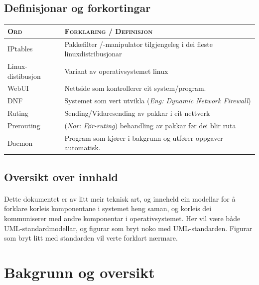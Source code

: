 \documentclass[nynorsk,12pt,a4paper]{article}
\begin{document}
\subsection{Definisjonar og forkortingar}
\begin{table}[h!]
	\begin{tabular}{ l p{11cm} }
	\textsc{Ord} & \textsc{Forklaring / Definisjon} \\ \hline
	IPtables & Pakkefilter /-manipulator tilgjengeleg i dei fleste linuxdistribusjonar \\
	Linux-distibusjon & Variant av operativsystemet linux \\
	WebUI & Nettside som kontrollerer eit system/program. \\
	DNF	& Systemet som vert utvikla (\emph{Eng: Dynamic Network Firewall}) \\
	Ruting & Sending/Vidaresending av pakkar i eit nettverk \\
	Prerouting & (\emph{Nor: Før-ruting}) behandling av pakkar før dei blir ruta \\
	Daemon & Program som kjører i bakgrunn og utfører oppgaver automatisk. \\
	\hline
	\end{tabular}
\end{table}

\subsection{Oversikt over innhald}
\paragraph{}
Dette dokumentet er av litt meir teknisk art, og inneheld ein modellar for å forklare korleis komponentane i systemet heng saman, og korleis dei kommuniserer med andre komponentar i operativsystemet. Her vil være både UML-standardmodellar, og figurar som bryt noko med UML-standarden. Figurar som bryt litt med standarden vil verte forklart nærmare.

\newpage
\section{Bakgrunn og oversikt}
\end{document}
